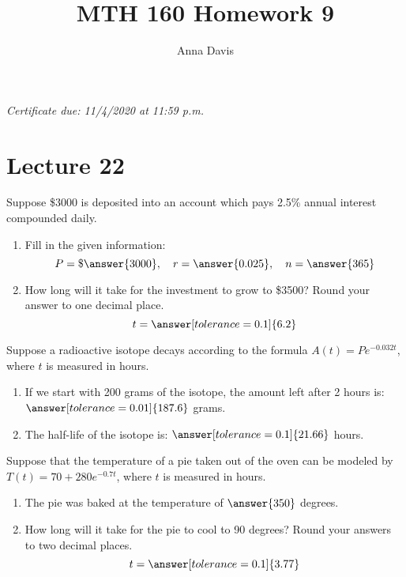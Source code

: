 \documentclass{ximera}
\author{Anna Davis} \title{MTH 160 Homework 9}
\begin{document}
\begin{abstract}

\end{abstract}
\maketitle
 \textit{Certificate due: 11/4/2020 at 11:59 p.m.}
 \section{Lecture 22}
 
  \begin{problem}\label{prob:160hom9prob1} 
Suppose \$3000 is deposited into an account which pays 2.5\% annual interest compounded daily.  
 \begin{enumerate}
 \item Fill in the given information:
 $$P=\$\answer{3000},\quad r=\answer{0.025},\quad n=\answer{365}$$
 \item How long will it take for the investment to grow to \$3500?
 Round your answer to one decimal place.
 $$t=\answer[tolerance=0.1]{6.2}$$
 \end{enumerate}
 \end{problem}
 
 \begin{problem}\label{prob:160hom9prob2} 
 Suppose a radioactive isotope decays according to the formula $A(t)=Pe^{-0.032t}$, where $t$ is measured in hours.  
 \begin{enumerate}
     \item 
If we start with 200 grams of the isotope, the amount left after 2 hours is: $\answer[tolerance=0.01]{187.6}$ grams.
\item The half-life of the isotope is: $\answer[tolerance=0.1]{21.66}$ hours.
\end{enumerate}

\begin{problem}\label{prob:160hom9prob3}
 Suppose that the temperature of a pie taken out of the oven can be modeled by $T(t)=70+280e^{-0.7t}$, where $t$ is measured in hours.
 \begin{enumerate}
     \item The pie was baked at the temperature of $\answer{350}$ degrees.
     \item How long will it take for the pie to cool to 90 degrees?  Round your answers to two decimal places.
     $$t=\answer[tolerance=0.1]{3.77}$$
 \end{enumerate}
 \end{problem}
 \end{problem}
 
\end{document}

